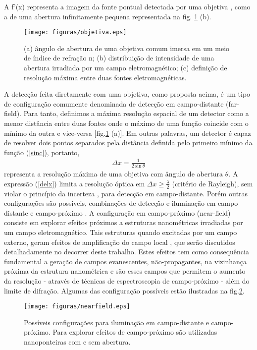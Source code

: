 A f'(x) representa a imagem da fonte pontual detectada por uma objetiva \cite{yoshie}, como a de uma abertura infinitamente pequena representada na fig. \ref{fig:objetiva} (b).

\begin{figure}[h]
\centering
\texttt{[image: figuras/objetiva.eps]}
\caption{(a) ângulo de abertura de uma objetiva comum imersa em um meio de índice de refração n; (b) distribuição de intensidade de uma abertura irradiada por um campo eletromagnético; (c) definição de resolução máxima entre duas fontes eletromagnéticas. \cite{principle}}
\label{fig:objetiva}
\end{figure} 

A detecção feita diretamente com uma objetiva, como proposta acima, é um tipo de configuração comumente denominada de detecção em campo-distante (far-field). Para tanto, definimos a máxima resolução espacial de um detector como a menor distância entre duas fontes onde o máximo de uma função coincide com o mínimo da outra e vice-versa [fig.\ref{fig:objetiva} (a)]. Em outras palavras, um detector é capaz de resolver dois pontos separados pela distância definida pelo primeiro mínimo da função (\ref{sinc}), portanto, 
\begin{eqnarray}
    \Delta x=\frac{1}{2\sin{\theta}}
\label{delx}
\end{eqnarray}
representa a resolução máxima de uma objetiva com ângulo de abertura $\theta$. A expressão (\ref{delx}) limita a resolução óptica em $\Delta x\geq\frac{\lambda}{2}$ (critério de Rayleigh), sem violar o princípio da incerteza \cite{yoshie}, para detecção em campo-distante.
Porém outras configurações são possiveis, combinações de detecção e iluminação em campo-distante e campo-próximo \cite{principle}. A configuração em campo-próximo (near-field) consiste em explorar efeitos próximos a estruturas nanométricas irradiadas por um campo eletromagnético. Tais estruturas quando excitadas por um campo externo, geram efeitos de amplificação do campo local \cite{principle,novotny,zayats,ropers,bouhelier,nature}, que serão discutidos detalhadamente no decorrer deste trabalho. Estes efeitos tem como consequência fundamental a geração de campos evanescentes, não-propagantes, na vizinhança próxima da estrutura nanométrica e são esses campos que permitem o aumento da resolução - através de técnicas de espectroscopia de campo-próximo - além do limite de difração. Algumas das configuração possíveis estão ilustradas na fig.\ref{fig:nearfield}.

\begin{figure}[h]
\centering
\texttt{[image: figuras/nearfield.eps]}
\caption{Possíveis configurações para iluminação em campo-distante e campo-próximo. Para explorar efeitos de campo-próximo são utilizadas nanoponteiras com e sem abertura. \cite{principle}}
\label{fig:nearfield}
\end{figure} 

